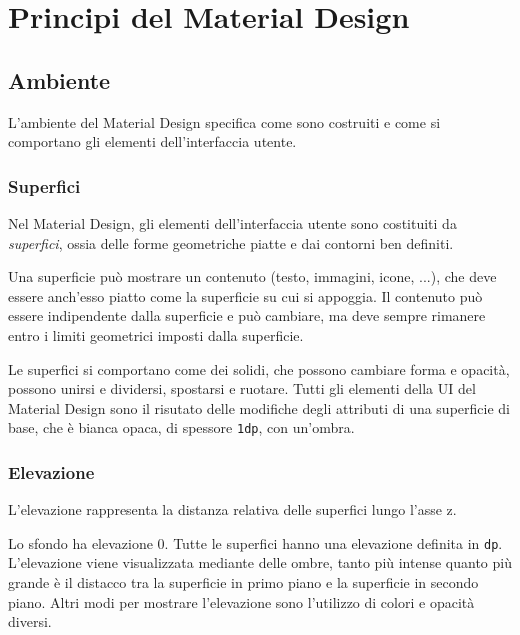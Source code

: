\documentclass[12pt, a4paper]{report}
\begin{document}
		



\chapter{Principi del Material Design}

	\section{Ambiente}
	L'ambiente del Material Design  \cite{environment} specifica come sono costruiti e come si comportano gli elementi dell'interfaccia utente.

		\subsection{Superfici}
		Nel Material Design, gli elementi dell'interfaccia utente sono costituiti da \textit{superfici}, ossia delle forme geometriche piatte e dai contorni ben definiti.

		Una superficie può mostrare un contenuto (testo, immagini, icone, ...), che deve essere anch'esso piatto come la superficie su cui si appoggia. Il contenuto può essere indipendente dalla superficie e può cambiare, ma deve sempre rimanere entro i limiti geometrici imposti dalla superficie.

		
		Le superfici si comportano come dei solidi, che possono cambiare forma e opacità, possono unirsi e dividersi, spostarsi e ruotare. Tutti gli elementi della UI del Material Design sono il risutato delle modifiche degli attributi di una superficie di base, che è bianca opaca, di spessore \texttt{1dp}, con un'ombra.
		

		\subsection{Elevazione}
		L'elevazione rappresenta la distanza relativa delle superfici lungo l'asse z.

		Lo sfondo ha elevazione 0. Tutte le superfici hanno una elevazione definita in \texttt{dp}. L'elevazione viene visualizzata mediante delle ombre, tanto più intense quanto più grande è il distacco tra la superficie in primo piano e la superficie in secondo piano. Altri modi per mostrare l'elevazione sono l'utilizzo di colori e opacità diversi.
		
\end{document}
